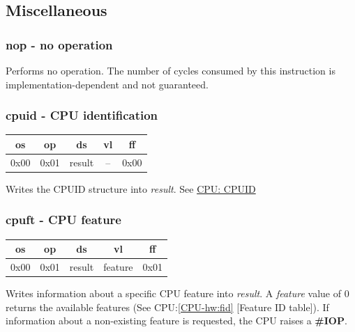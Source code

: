 \documentclass[a4paper,10pt]{article}
\begin{document}
\newcommand{\opi}[6]{
	\begin{table}[H]
		\centering
		\begin{tabular}{|c|c|c|c|c|}
	\hline
	os & op & ds & vl & ff \\
	\hline
	#1 & #2 & #3 & #4 & #5 \\
	\hline
		\end{tabular}
	\end{table}

	#6

	\lstset{title=Implementation}%
}

\newcommand{\opj}[5]{
	\begin{table}[H]
		\centering
		\begin{tabular}{|c|c|c|c|}
	\hline
	os & op & tg & rc \\
	\hline
	#1 & #2 & #3 & #4 \\
	\hline
		\end{tabular}
	\end{table}

	#5

	\lstset{title=Implementation}%
}

\subsection{Miscellaneous}
\subsubsection{nop - no operation}
	{Performs no operation. The number of cycles consumed by this instruction is implementation-dependent and not guaranteed.}

\subsubsection{cpuid - CPU identification}
\opi{0x00}{0x01}{result}{--}{0x00}
	{Writes the CPUID structure into \emph{result}. See \hyperref[CPU-st:CPUID]{CPU: CPUID}}

\subsubsection{cpuft - CPU feature}
\opi{0x00}{0x01}{result}{feature}{0x01}
	{Writes information about a specific CPU feature into \emph{result}. A \emph{feature} value of 0 returns the available features (See CPU:\ref{CPU-hw:fid} [Feature ID table]). If information about a non-existing feature is requested, the CPU raises a \textbf{\#IOP}.}
\end{document}
